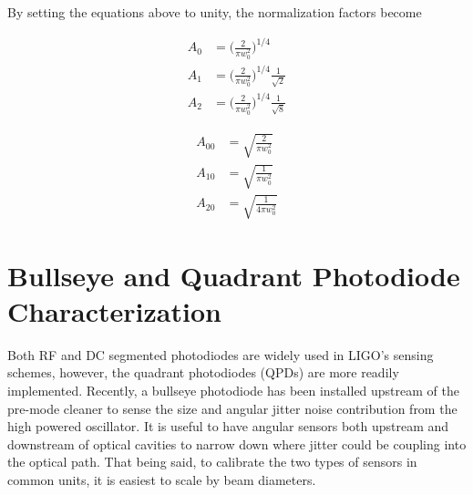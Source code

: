 \begin{appendices}
	By setting the equations above to unity, the normalization factors become
	
	\begin{equation}
	\begin{aligned}
		A_{0} &	= \bigg( \frac{2}{\pi w_0^2} \bigg)^{1/4} 
	\\	A_{1} &	= \bigg( \frac{2}{\pi w_0^2} \bigg)^{1/4} \frac{1}{\sqrt{2}}
	\\	A_{2} &	= \bigg( \frac{2}{\pi w_0^2} \bigg)^{1/4} \frac{1}{\sqrt{8}}
	\end{aligned}
	\end{equation}
	
	\begin{equation}
	\begin{aligned}
		A_{00} &	= \sqrt{\frac{2}{\pi w_0^2}}
	\\	A_{10} &	= \sqrt{\frac{1}{\pi w_0^2}}
	\\	A_{20} &	= \sqrt{\frac{1}{4\pi w_0^2}}
	\end{aligned}
	\end{equation}
	
	\chapter{Bullseye and Quadrant Photodiode Characterization}\label{BPDchar}
	Both RF and DC segmented photodiodes are widely used in LIGO's sensing schemes, however, the quadrant photodiodes (QPDs) are more readily implemented.  Recently, a bullseye photodiode has been installed upstream of the pre-mode cleaner to sense the size and angular jitter noise contribution from the high powered oscillator.  It is useful to have angular sensors both upstream and downstream of optical cavities to narrow down where jitter could be coupling into the optical path.  That being said, to calibrate the two types of sensors in common units, it is easiest to scale by beam diameters.

\end{appendices}
